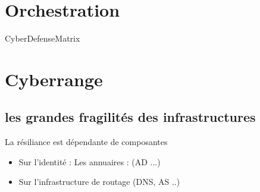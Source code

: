 
\section{Orchestration}

CyberDefenseMatrix  \cite{dutta2019cyber}

\section{Cyberrange}



\subsection {les grandes fragilités des infrastructures}

La résiliance est dépendante de composantes 
\begin{itemize}
  \item Sur l'identité : Les annuaires : (AD ...)
  \item Sur l'infrastructure de routage (DNS, AS ..)
\end{itemize}


